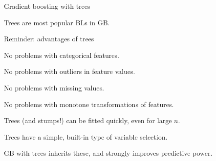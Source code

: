 \documentclass[11pt,compress,t,notes=noshow, xcolor=table]{beamer}
\begin{document}

\begin{vbframe}{Gradient boosting with trees}

Trees are most popular BLs in GB.

\begin{blocki}{Reminder: advantages of trees}
\item No problems with categorical features.
\item No problems with outliers in feature values.
\item No problems with missing values.
\item No problems with monotone transformations of features.
\item Trees (and stumps!) can be fitted quickly, even for large $n$.
\item Trees have a simple, built-in type of variable selection.
\end{blocki}
GB with trees inherits these, and strongly improves predictive power.

\end{vbframe}
\end{document}
